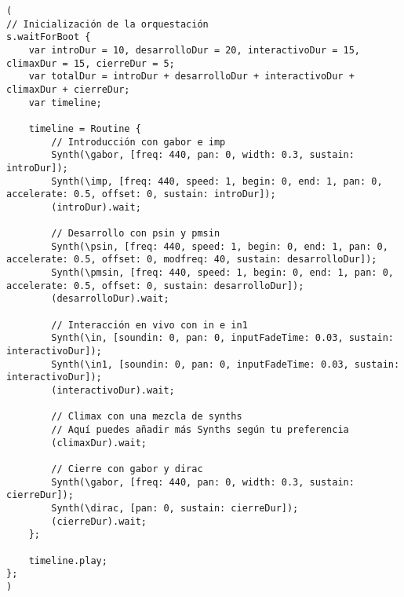 \begin{minipage}[t]{1\textwidth}
    \centering
    \begin{lstlisting}[style=SuperCollider-IDE, basicstyle=\footnotesize\ttfamily, numbers=none]
(
// Inicialización de la orquestación
s.waitForBoot {
    var introDur = 10, desarrolloDur = 20, interactivoDur = 15, climaxDur = 15, cierreDur = 5;
    var totalDur = introDur + desarrolloDur + interactivoDur + climaxDur + cierreDur;
    var timeline;

    timeline = Routine {
        // Introducción con gabor e imp
        Synth(\gabor, [freq: 440, pan: 0, width: 0.3, sustain: introDur]);
        Synth(\imp, [freq: 440, speed: 1, begin: 0, end: 1, pan: 0, accelerate: 0.5, offset: 0, sustain: introDur]);
        (introDur).wait;

        // Desarrollo con psin y pmsin
        Synth(\psin, [freq: 440, speed: 1, begin: 0, end: 1, pan: 0, accelerate: 0.5, offset: 0, modfreq: 40, sustain: desarrolloDur]);
        Synth(\pmsin, [freq: 440, speed: 1, begin: 0, end: 1, pan: 0, accelerate: 0.5, offset: 0, sustain: desarrolloDur]);
        (desarrolloDur).wait;

        // Interacción en vivo con in e in1
        Synth(\in, [soundin: 0, pan: 0, inputFadeTime: 0.03, sustain: interactivoDur]);
        Synth(\in1, [soundin: 0, pan: 0, inputFadeTime: 0.03, sustain: interactivoDur]);
        (interactivoDur).wait;

        // Climax con una mezcla de synths
        // Aquí puedes añadir más Synths según tu preferencia
        (climaxDur).wait;

        // Cierre con gabor y dirac
        Synth(\gabor, [freq: 440, pan: 0, width: 0.3, sustain: cierreDur]);
        Synth(\dirac, [pan: 0, sustain: cierreDur]);
        (cierreDur).wait;
    };

    timeline.play;
};
)                                     
    \end{lstlisting}
    \vspace{1cm}
\end{minipage}



















